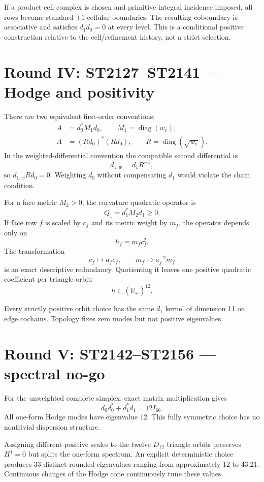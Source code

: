 \documentclass[11pt,a4paper]{article}
\begin{document}
If a product cell complex is chosen and primitive integral incidence imposed,
all rows become standard $\pm1$ cellular boundaries.  The resulting coboundary
is associative and satisfies $d_1d_0=0$ at every level.  This is a conditional
positive construction relative to the cell/refinement history, not a strict
selection.

\section{Round IV: ST2127--ST2141 --- Hodge and positivity}

There are two equivalent first-order conventions:
\begin{align*}
A&=d_0^*M_1d_0,\qquad M_1=\operatorname{diag}(w_e),\\
A&=(Rd_0)^*(Rd_0),\qquad R=\operatorname{diag}(\sqrt{w_e}).
\end{align*}
In the weighted-differential convention the compatible second differential is
\[
d_{1,w}=d_1R^{-1},
\]
so $d_{1,w}Rd_0=0$.  Weighting $d_0$ without compensating $d_1$ would violate
the chain condition.

For a face metric $M_2>0$, the curvature quadratic operator is
\[
Q_1=d_1^*M_2d_1\ge0.
\]
If face row $f$ is scaled by $c_f$ and its metric weight by $m_f$, the operator
depends only on
\[
h_f=m_fc_f^2.
\]
The transformation
\[
c_f\mapsto a_fc_f,\qquad m_f\mapsto a_f^{-2}m_f
\]
is an exact descriptive redundancy.  Quotienting it leaves one positive
quadratic coefficient per triangle orbit:
\[
h\in(\mathbb R_+)^{12}.
\]

Every strictly positive orbit choice has the same $d_1$ kernel of dimension 11
on edge cochains.  Topology fixes zero modes but not positive eigenvalues.

\section{Round V: ST2142--ST2156 --- spectral no-go}

For the unweighted complete simplex, exact matrix multiplication gives
\[
d_0d_0^*+d_1^*d_1=12I_{66}.
\]
All one-form Hodge modes have eigenvalue 12.  This fully symmetric choice has no
nontrivial dispersion structure.

Assigning different positive scales to the twelve $D_{12}$ triangle orbits
preserves $H^1=0$ but splits the one-form spectrum.  An explicit deterministic
choice produces 33 distinct rounded eigenvalues ranging from approximately 12
to 43.21.  Continuous changes of the Hodge cone continuously tune these values.
\end{document}
